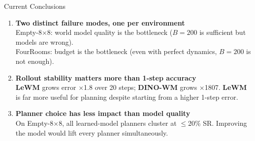 \documentclass[aspectratio=169, 11pt]{beamer}
\newcommand{\lewm}{\textcolor{LeWMc}{\textbf{LeWM}}\xspace}
\newcommand{\dino}{\textcolor{DINOc}{\textbf{DINO-WM}}\xspace}
\begin{document}
\begin{frame}{Current Conclusions}

  \begin{enumerate}
    \setlength\itemsep{1.0em}

    \item \textbf{Two distinct failure modes, one per environment}\\
    {\small Empty-8$\times$8: world model quality is the bottleneck ($B=200$ is sufficient but models are wrong).\\
    FourRooms: budget is the bottleneck (even with perfect dynamics, $B=200$ is not enough).}

    \item \textbf{Rollout stability matters more than 1-step accuracy}\\
    {\small \lewm grows error $\times$1.8 over 20 steps; \dino grows $\times$1807. \lewm is far more useful for planning despite starting from a higher 1-step error.}

    \item \textbf{Planner choice has less impact than model quality}\\
    {\small On Empty-8$\times$8, all learned-model planners cluster at $\leq$20\% SR. Improving the model would lift every planner simultaneously.}

  \end{enumerate}

\end{frame}
\end{document}
